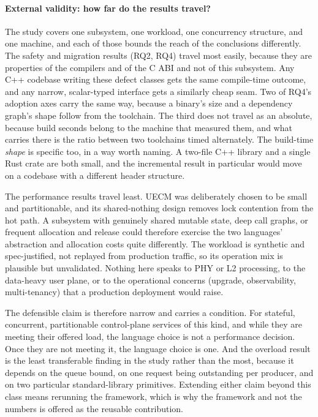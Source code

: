 \documentclass[english,oneside,a4paper,censored,csm,software-track-2020]{HYthesisML}
\begin{document}
\paragraph{External validity: how far do the results travel?}
The study covers one subsystem, one workload, one concurrency structure, and one machine, and
each of those bounds the reach of the conclusions differently. The safety and migration
results (RQ2, RQ4) travel most easily, because they are properties of the compilers and
of the C ABI and not of this subsystem. Any C++ codebase writing these defect classes gets
the same compile-time outcome, and any narrow, scalar-typed interface gets a similarly cheap
seam. Two of RQ4's adoption axes carry the same way, because a binary's size and a dependency
graph's shape follow from the toolchain. The third does not travel as an absolute, because
build seconds belong to the machine that measured them, and what carries there is the ratio
between two toolchains timed alternately. The build-time \emph{shape} is specific too, in a way
worth naming. A two-file C++ library and a single Rust crate are both small, and the incremental
result in particular would move on a codebase with a different header structure.

The performance
results travel least. UECM was deliberately chosen to be small and
partitionable, and its shared-nothing design removes lock contention from the hot path. A
subsystem with genuinely shared mutable state, deep call graphs, or frequent allocation and release could
therefore exercise the two languages' abstraction and allocation costs quite differently. The
workload is synthetic and spec-justified, not replayed from production traffic, so its operation
mix is plausible but unvalidated. Nothing here speaks to PHY or L2 processing, to the data-heavy
user plane, or to the operational concerns (upgrade, observability, multi-tenancy) that a
production deployment would raise.

The defensible claim is therefore narrow and carries a condition. For
stateful, concurrent, partitionable control-plane services of this kind, and while they are
meeting their offered load, the language choice is not a performance decision. Once they are not
meeting it, the language choice is one. And the overload result is the least transferable finding
in the study rather than the most, because it depends on the queue bound, on one request being
outstanding per producer, and on two particular standard-library primitives. Extending either
claim beyond this class means rerunning the framework, which is why the framework and not the
numbers is offered as the reusable contribution.
\end{document}
